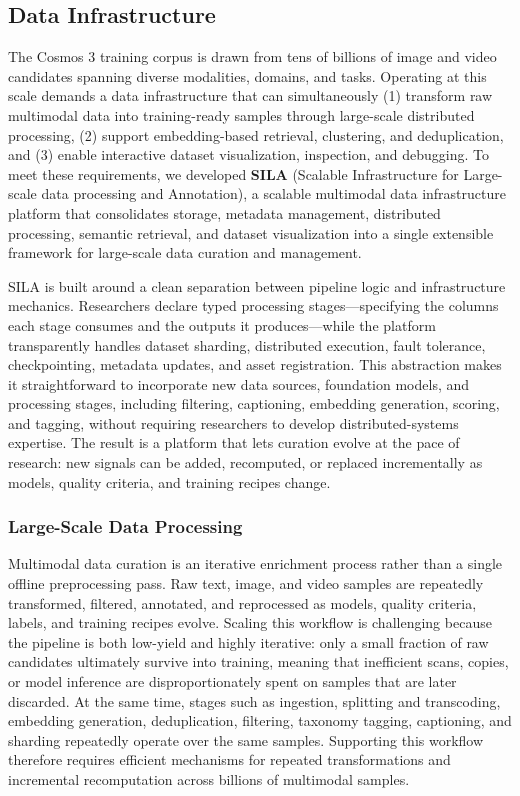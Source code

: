 \subsection{Data Infrastructure}
\label{subsec::data_infrastructure}
The Cosmos 3 training corpus is drawn from tens of billions of image and video candidates spanning diverse modalities, domains, and tasks. Operating at this scale demands a data infrastructure that can simultaneously (1) transform raw multimodal data into training-ready samples through large-scale distributed processing, (2) support embedding-based retrieval, clustering, and deduplication, and (3) enable interactive dataset visualization, inspection, and debugging. To meet these requirements, we developed \textbf{SILA} (Scalable Infrastructure for Large-scale data processing and Annotation), a scalable multimodal data infrastructure platform that consolidates storage, metadata management, distributed processing, semantic retrieval, and dataset visualization into a single extensible framework for large-scale data curation and management.

SILA is built around a clean separation between pipeline logic and infrastructure mechanics. Researchers declare typed processing stages---specifying the columns each stage consumes and the outputs it produces---while the platform transparently handles dataset sharding, distributed execution, fault tolerance, checkpointing, metadata updates, and asset registration. This abstraction makes it straightforward to incorporate new data sources, foundation models, and processing stages, including filtering, captioning, embedding generation, scoring, and tagging, without requiring researchers to develop distributed-systems expertise. The result is a platform that lets curation evolve at the pace of research: new signals can be added, recomputed, or replaced incrementally as models, quality criteria, and training recipes change.

\subsubsection{Large-Scale Data Processing}
Multimodal data curation is an iterative enrichment process rather than a single offline preprocessing pass. Raw text, image, and video samples are repeatedly transformed, filtered, annotated, and reprocessed as models, quality criteria, labels, and training recipes evolve. Scaling this workflow is challenging because the pipeline is both low-yield and highly iterative: only a small fraction of raw candidates ultimately survive into training, meaning that inefficient scans, copies, or model inference are disproportionately spent on samples that are later discarded. At the same time, stages such as ingestion, splitting and transcoding, embedding generation, deduplication, filtering, taxonomy tagging, captioning, and sharding repeatedly operate over the same samples. Supporting this workflow therefore requires efficient mechanisms for repeated transformations and incremental recomputation across billions of multimodal samples.

